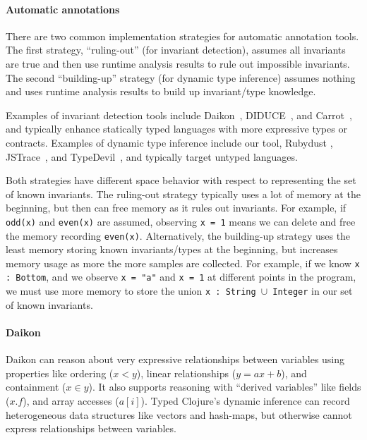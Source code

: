 \paragraph{Automatic annotations}
There are two common implementation strategies for automatic annotation tools. The first
strategy, ``ruling-out'' (for invariant detection), assumes all invariants are true 
and then use runtime analysis results to rule out
impossible invariants. The second ``building-up'' strategy (for dynamic type inference)
assumes nothing and uses runtime analysis results to build up invariant/type knowledge.

Examples of invariant detection tools include Daikon~,
DIDUCE~, and Carrot~, and
typically enhance statically typed languages with more expressive types or contracts.
Examples of dynamic type inference include our tool, Rubydust ,
JSTrace~, and TypeDevil~,
and typically target untyped languages.

Both strategies have different space behavior with respect to representing
the set of known invariants.
The ruling-out strategy typically uses a lot of memory at the beginning,
but then can free memory as it rules out invariants. For example, if
\texttt{odd(x)} and \texttt{even(x)} are assumed, observing \texttt{x = 1}
means we can delete and free the memory recording \texttt{even(x)}.
Alternatively, the building-up strategy uses the least memory storing
known invariants/types at the beginning, but increases memory usage
as more the more samples are collected. For example, if we know
\texttt{x : Bottom}, and we observe \texttt{x = "a"} and \texttt{x = 1}
at different points in the program, we must use more memory to
store the union \texttt{x : String $\cup$ Integer} in our set of known invariants.

\paragraph{Daikon}
Daikon can reason about very expressive relationships between variables
using properties like ordering ($x < y$), linear relationships ($y = ax + b$),
and containment ($x \in y$). It also supports reasoning with ``derived variables''
like fields ($x.f$), and array accesses ($a[i]$).
%
Typed Clojure's dynamic inference can record heterogeneous data structures
like vectors and hash-maps, but otherwise cannot express relationships
between variables.

